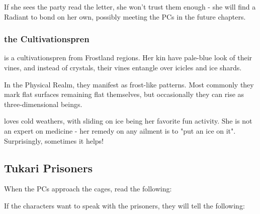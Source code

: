 If she sees the party read the letter, she won't trust them enough - she will find a Radiant to bond on her own, possibly meeting the PCs in the future chapters.

\subsubsection{\npcIceCultivationsprenGardener{} the Cultivationspren}

\npcIceCultivationsprenGardener{} is a cultivationspren from Frostland regions. Her kin have pale-blue look of their vines, and instead of crystals, their vines entangle over icicles and ice shards.

In the Physical Realm, they manifest as frost-like patterns. Most commonly they mark flat surfaces remaining flat themselves, but occasionally they can rise as three-dimensional beings.

\npcIceCultivationsprenGardener{} loves cold weathers, with sliding on ice being her favorite fun activity. She is not an expert on medicine - her remedy on any ailment is to "put an ice on it". Surprisingly, sometimes it helps!



\subsection{Tukari Prisoners}
\label{ssec:unyieldingFidelityTukari}

When the PCs approach the cages, read the following:


If the characters want to speak with the prisoners, they will tell the following:




